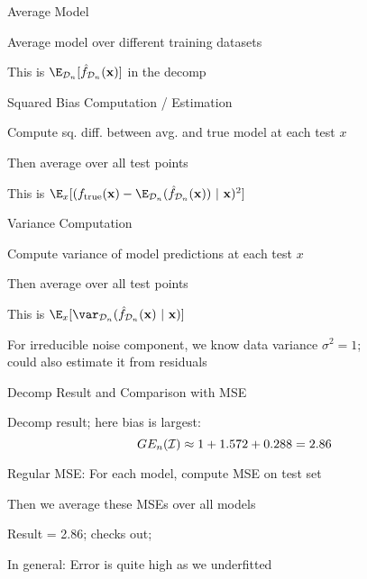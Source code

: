 \documentclass[11pt,compress,t,notes=noshow, xcolor=table]{beamer}
\begin{document}
\begin{framei}[sep=L]{Average Model}

\item Average model over different training datasets
\item This is $\E_{\D_n}[\fh_{\D_n}(\xv)]$ in the decomp

\hfill


\end{framei} 


\begin{framei}[sep=M]{Squared Bias Computation / Estimation}

\item Compute sq. diff. between avg. and true model at each test $x$
\item Then average over all test points
\item This is 
$ 
\E_x[ ( \ftrue(\xv)-\E_{\D_n} (\fh_{\D_n}(\xv) )~|~\xv)^2]
$




\end{framei} 


\begin{framei}[sep=M]{Variance Computation}

\item Compute variance of model predictions at each test $x$
\item Then average over all test points
\item This is 
$
\E_{x} [\var_{\D_n} (\fh_{\D_n}(\xv) ~|~\xv ) ]
$


\item For irreducible noise component, we know data variance $\sigma^2=1$;\\
could also estimate it from residuals

\end{framei} 


\begin{framei}[fs=small,sep=M]{Decomp Result and Comparison with MSE}

\item Decomp result; here bias is largest:
$$GE_n(\mathcal{I}) \approx 1 + 1.572 + 0.288 = 2.86 $$


\item Regular MSE: For each model, compute MSE on test set
\item Then we average these MSEs over all models
\item Result = 2.86; checks out; \\
\item In general: Error is quite high as we underfitted

\end{framei}
\end{document}
